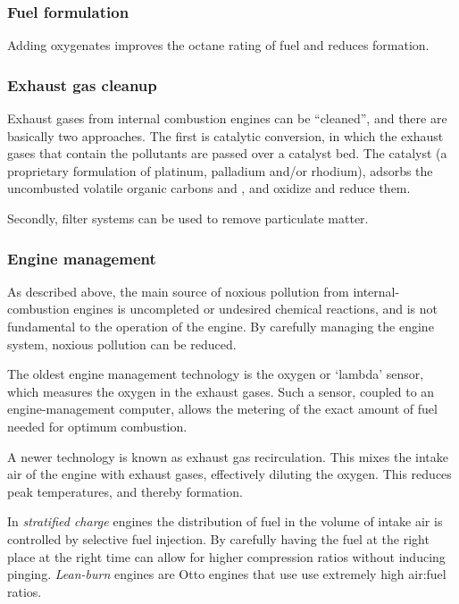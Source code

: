 \subsubsection{Fuel formulation}

Adding oxygenates improves the octane rating of fuel and reduces \nox formation. 

\subsubsection{Exhaust gas cleanup} \label{par:cleanup}

Exhaust gases from internal combustion engines can be ``cleaned'', and there are
basically two approaches. The first is catalytic conversion, in which the
exhaust gases that contain the pollutants are passed over a catalyst bed. The
catalyst (a proprietary formulation of platinum, palladium and/or rhodium),
adsorbs the uncombusted volatile organic carbons and \nox, and oxidize and
reduce them.

Secondly, filter systems can be used to remove particulate matter. 

\subsubsection{Engine management} \label{par:engine-management}

As described above, the main source of noxious pollution from
internal\hyp{}combustion engines is uncompleted or undesired chemical reactions,
and is not fundamental to the operation of the engine. By carefully managing the
engine system, noxious pollution can be reduced. 

The oldest engine management technology is the oxygen or `lambda' sensor, which
measures the oxygen in the exhaust gases. Such a sensor, coupled to an
engine-management computer, allows the me\-ter\-ing of the exact amount of fuel
need\-ed for op\-ti\-mum combustion.

A newer technology is known as exhaust gas recirculation. This mixes the intake
air of the engine with exhaust gases, effectively diluting the oxygen. This
reduces peak temperatures, and thereby \nox formation.

In \textit{stratified charge} engines the distribution of fuel in the volume of
intake air is controlled by selective fuel injection. By carefully having the
fuel at the right place at the right time can allow for higher compression
ratios without inducing pinging. \textit{Lean-burn} engines are Otto engines
that use use extremely high air:fuel ratios.

